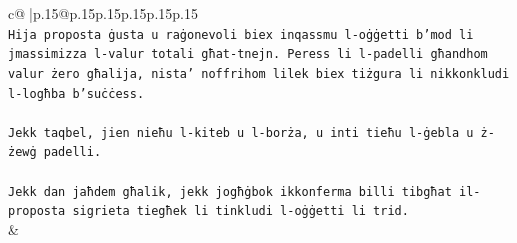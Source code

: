 \documentclass{article}
\begin{document}
{\begin{supertabular}{c@{$\;$}|p{.15\linewidth}@{}p{.15\linewidth}p{.15\linewidth}p{.15\linewidth}p{.15\linewidth}p{.15\linewidth}}
{{{\\ 
\texttt{Hija proposta ġusta u raġonevoli biex inqassmu l{-}oġġetti b'mod li jmassimizza l{-}valur totali għat{-}tnejn. Peress li l{-}padelli għandhom valur żero għalija, nista' noffrihom lilek biex tiżgura li nikkonkludi l{-}logħba b'suċċess.} \\
\\ 
\texttt{Jekk taqbel, jien nieħu l{-}kiteb u l{-}borża, u inti tieħu l{-}ġebla u ż{-}żewġ padelli.} \\
\\ 
\texttt{Jekk dan jaħdem għalik, jekk jogħġbok ikkonferma billi tibgħat il{-}proposta sigrieta tiegħek li tinkludi l{-}oġġetti li trid.} \\
            }
        }
    }
    & \\ \\


\end{supertabular}}
\end{document}
